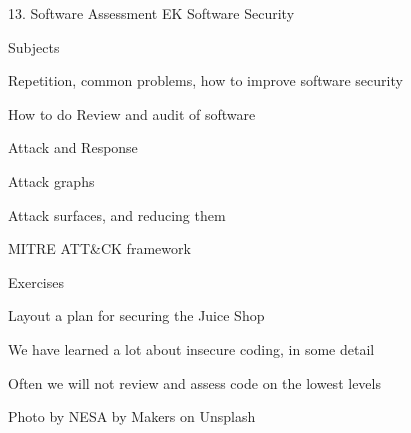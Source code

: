 \documentclass[Screen16to9,17pt]{foils}
\begin{document}
\mytitlepage
{13. Software Assessment}
{EK  Software Security}


\begin{list1}
\item Subjects
\begin{list2}
\item Repetition, common problems, how to improve software security
\item How to do Review and audit of software
\item Attack and Response
\item Attack graphs
\item Attack surfaces, and reducing them
\item MITRE ATT\&CK framework
\end{list2}
\item Exercises
\begin{list2}
\item Layout a plan for securing the Juice Shop
\end{list2}
\end{list1}






\begin{list1}
\item We have learned a lot about insecure coding, in some detail
\item Often we will not review and assess code on the lowest levels
\end{list1}

\hfill {\small Photo by NESA by Makers on Unsplash}
\end{document}

